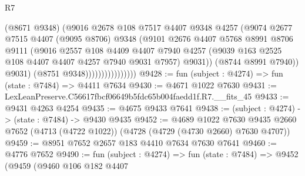 \begin{lexlean}{R7}
\begin{coremodule}
                                  (@8671 @9348)
                                  (@9016
                                    @2678
                                    @108
                                    @7517
                                    @4407
                                    @9348
                                    @4257
                                    (@9074
                                      @2677
                                      @7515
                                      @4407
                                      (@9095 @8706)
                                      @9348
                                      (@9101
                                        @2676
                                        @4407
                                        @5768
                                        @8991
                                        @8706
                                        @9111
                                        (@9016
                                          @2557
                                          @108
                                          @4409
                                          @4407
                                          @7940
                                          @4257
                                          (@9039
                                            @163
                                            @2525
                                            @108
                                            @4407
                                            @4407
                                            @4257
                                            @7940
                                            @9031
                                            @7957)
                                          @9031))
                                      (@8744 @8991 @7940))
                                    @9031)
                                  (@8751 @9348))))))))))))))))
@9428 := fun (subject : @4274) => fun (state : @7484) => @4411 @7634
@9430 := @4671 @1022 @7630
@9431 := LexLeanPreserve.C56617fbcf06649b5fdc65b004faedd1f.R7.__fits_45
@9433 := @9431 @4263 @4254
@9435 := @4675 @9433 @7641
@9438 := (subject : @4274) -> (state : @7484) -> @9430 @9435
@9452 := @4689
    @1022
    @7630
    @9435
    @2660
    @7652
    (@4713 (@4722 @1022))
    (@4728 (@4729 (@4730 @2660) @7630 @4707))
@9459 := @8951 @7652 @2657 @183 @4410 @7634 @7630 @7641
@9460 := @4776 @7652
@9490 := fun (subject : @4274) =>
  fun (state : @7484) =>
  @9452
    (@9459
      (@9460
        @106
        @182
        @4407

\end{coremodule}
\end{lexlean}
